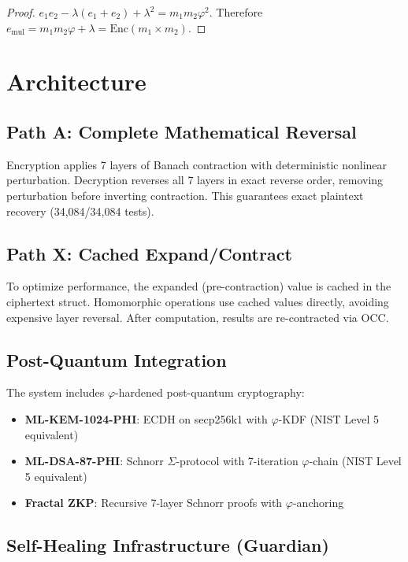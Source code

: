 \documentclass[11pt,a4paper]{article}
\begin{document}
\begin{proof}
$e_1 e_2 - \lambda(e_1 + e_2) + \lambda^2 = m_1 m_2 \varphi^2$. Therefore $e_{\text{mul}} = m_1 m_2 \varphi + \lambda = \text{Enc}(m_1 \times m_2)$.
\end{proof}

\section{Architecture}

\subsection{Path A: Complete Mathematical Reversal}

Encryption applies 7 layers of Banach contraction with deterministic nonlinear perturbation. Decryption reverses all 7 layers in exact reverse order, removing perturbation before inverting contraction. This guarantees exact plaintext recovery (34,084/34,084 tests).

\subsection{Path X: Cached Expand/Contract}

To optimize performance, the expanded (pre-contraction) value is cached in the ciphertext struct. Homomorphic operations use cached values directly, avoiding expensive layer reversal. After computation, results are re-contracted via OCC.

\subsection{Post-Quantum Integration}

The system includes $\varphi$-hardened post-quantum cryptography:
\begin{itemize}
    \item \textbf{ML-KEM-1024-PHI}: ECDH on secp256k1 with $\varphi$-KDF (NIST Level 5 equivalent)
    \item \textbf{ML-DSA-87-PHI}: Schnorr $\Sigma$-protocol with 7-iteration $\varphi$-chain (NIST Level 5 equivalent)
    \item \textbf{Fractal ZKP}: Recursive 7-layer Schnorr proofs with $\varphi$-anchoring
\end{itemize}

\subsection{Self-Healing Infrastructure (Guardian)}
\end{document}
